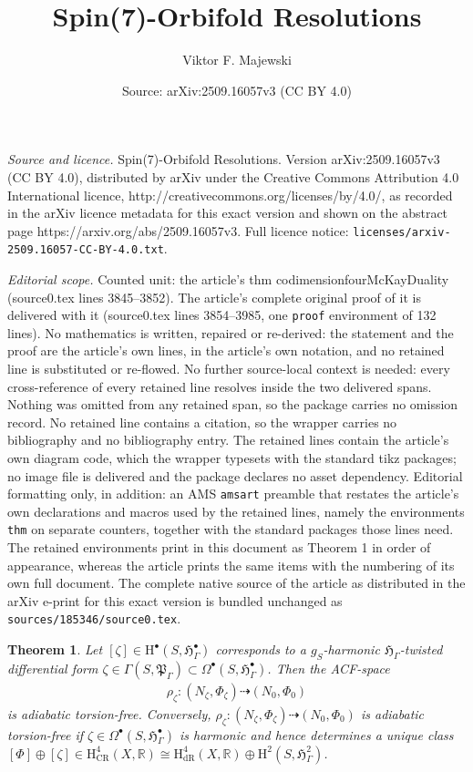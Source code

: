 \documentclass[10pt,a4paper]{amsart}
\title{Spin(7)-Orbifold Resolutions}
\author{Viktor F. Majewski}
\date{Source: arXiv:2509.16057v3 (CC BY 4.0)}
\newtheorem{thm}{Theorem}
\newcommand{\m}[1]{{\mathrm{#1}}}
\begin{document}
\maketitle

\noindent\emph{Source and licence.} Spin(7)-Orbifold Resolutions. Version arXiv:2509.16057v3 (CC BY 4.0), distributed by arXiv under the Creative Commons Attribution 4.0 International licence, http://creativecommons.org/licenses/by/4.0/, as recorded in the arXiv licence metadata for this exact version and shown on the abstract page https://arxiv.org/abs/2509.16057v3. Full licence notice: \texttt{licenses/arxiv-2509.16057-CC-BY-4.0.txt}.\par\smallskip

\noindent\textit{Editorial scope.} Counted unit: the article's thm codimensionfourMcKayDuality (source0.tex lines 3845--3852). The article's complete original proof of it is delivered with it (source0.tex lines 3854--3985, one \texttt{proof} environment of 132 lines). No mathematics is written, repaired or re-derived: the statement and the proof are the article's own lines, in the article's own notation, and no retained line is substituted or re-flowed.  No further source-local context is needed: every cross-reference of every retained line resolves inside the two delivered spans.  Nothing was omitted from any retained span, so the package carries no omission record.  No retained line contains a citation, so the wrapper carries no bibliography and no bibliography entry.  The retained lines contain the article's own diagram code, which the wrapper typesets with the standard tikz packages; no image file is delivered and the package declares no asset dependency.  Editorial formatting only, in addition: an AMS \texttt{amsart} preamble that restates the article's own declarations and macros used by the retained lines, namely the environments \texttt{thm} on separate counters, together with the standard packages those lines need.  The retained environments print in this document as Theorem 1 in order of appearance, whereas the article prints the same items with the numbering of its own full document.  The complete native source of the article as distributed in the arXiv e-print for this exact version is bundled unchanged as \texttt{sources/185346/source0.tex}.
\begin{thm}
\label{codimensionfourMcKayDuality}
    Let $[\zeta]\in \m{H}^\bullet(S,\mathfrak{H}^\bullet_\Gamma)$ corresponds to a $g_S$-harmonic $\mathfrak{H}_\Gamma$-twisted differential form $\zeta\in \Gamma(S,\mathfrak{P}_\Gamma)\subset \Omega^\bullet(S,\mathfrak{H}^\bullet_\Gamma)$. Then the ACF-space 
    \begin{align*}
        \rho_\zeta\colon (N_\zeta,\Phi_\zeta)\dashrightarrow (N_0,\Phi_0)
    \end{align*}
    is adiabatic torsion-free. Conversely, $\rho_\zeta\colon (N_\zeta,\Phi_\zeta)\dashrightarrow (N_0,\Phi_0)$ is adiabatic torsion-free if $\zeta\in \Omega^\bullet(S,\mathfrak{H}^\bullet_\Gamma)$ is harmonic and hence determines a unique class $[\Phi]\oplus[\zeta]\in \m{H}^4_{\m{CR}}(X,\mathbb{R})\cong \m{H}^4_{\m{dR}}(X,\mathbb{R})\oplus \m{H}^2(S,\mathfrak{H}^2_\Gamma)$.
\end{thm}
\end{document}
